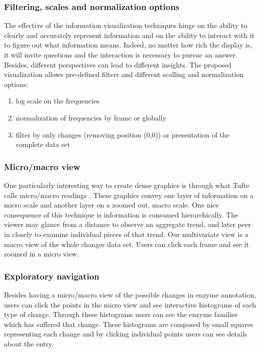 \subsubsection{Filtering, scales and normalization options}

The effective of the information visualization techniques hinge on the ability to clearly and accurately represent information and on the ability to interact with it to figure out what information means. Indeed, no matter how rich the display is, it will invite questions and the interaction is necessary to pursue an answer. Besides, different perspectives can lead to different insights. The proposed visualization allows pre-defined filters and different scalling and normalization options: 

\begin{enumerate}
\item log scale on the frequencies
\item normalization of frequencies by frame or globally
\item filter by only changes (removing position (0,0)) or presentation of the complete data set
\end{enumerate}

\subsubsection{Micro/macro view}

One particularly interesting way to create dense graphics is through what Tufte calls micro/macro readings \cite{tufte_envisioning}. These graphics convey one layer of information on a micro scale and another layer on a zoomed out, macro scale. One nice consequence of this technique is information is consumed hierarchically. The viewer may glance from a distance to observe an aggregate trend, and later peer in closely to examine individual pieces of that trend. Our multivariate view is a macro view of the whole changes data set. Users can click each frame and see it zoomed in a micro view. 

\subsubsection{Exploratory navigation}

Besides having a micro/macro view of the possible changes in enzyme annotation, users can click the points in the micro view and see interactive histograms of each type of change. Through these histograms users can see the enzyme families which has suffered that change. These histograms are composed by small squares representing each change and by clicking individual points users can see details about the entry. 

